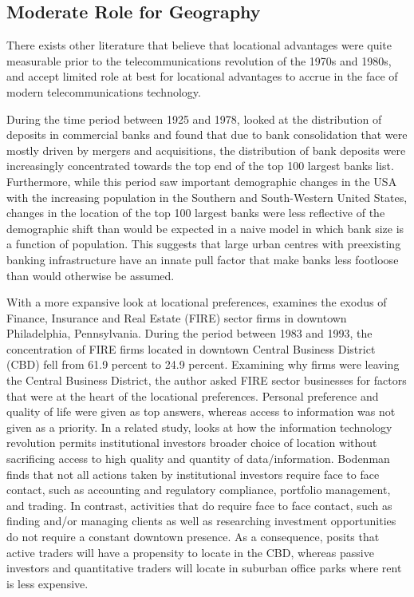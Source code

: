 \subsection{Moderate Role for Geography}
	
There exists other literature that believe that locational advantages were quite measurable prior to the telecommunications revolution of the 1970s and 1980s, and accept limited role at best for locational advantages to accrue in the face of modern telecommunications technology.
	
During the time period between 1925 and 1978, \cite{rhoades1982size} looked at the distribution of deposits in commercial banks and found that due to bank consolidation that were mostly driven by mergers and acquisitions, the distribution of bank deposits were increasingly concentrated towards the top end of the top 100 largest banks list. Furthermore, while this period saw important demographic changes in the USA with the increasing population in the Southern and South-Western United States, changes in the location of the top 100 largest banks were less reflective of the demographic shift than would be expected in a naive model in which bank size is a function of population.  This suggests that large urban centres with preexisting banking infrastructure have an innate pull factor that make banks less footloose than would otherwise be assumed.  
	

With a more expansive look at locational preferences, \cite{bodenmanthe1998} examines the exodus of  Finance, Insurance and Real Estate (FIRE) sector firms in downtown Philadelphia, Pennsylvania.   During the period between 1983 and 1993, the concentration of FIRE firms located in downtown Central Business District (CBD) fell from 61.9 percent to 24.9 percent.  Examining why firms were leaving the Central Business District, the author asked FIRE sector businesses for factors that were at the heart of the locational preferences.  Personal preference and quality of life were given as top answers, whereas access to information was not given as a priority.  In a related study, \cite{bodenmanfirm2000} looks at how the information technology revolution permits institutional investors broader choice of location without sacrificing access to high quality and quantity of data/information.  Bodenman finds that not all actions taken by institutional investors require face to face contact, such as accounting and regulatory compliance, portfolio management, and trading.  In contrast, activities that do require face to face contact, such as finding and/or managing clients as well as researching investment opportunities do not require a constant downtown presence. As a consequence, \cite{bodenmanfirm2000} posits that active traders will have a propensity to locate in the CBD, whereas passive investors and quantitative traders will locate in suburban office parks where rent is less expensive.  
	
